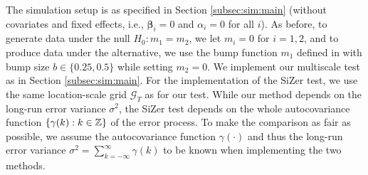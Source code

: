 \documentclass[12pt]{article}
\makeatletter
\renewcommand{\eqref}[1]{\tagform@{\ref{#1}}}
\makeatother
\begin{document}
The simulation setup is as specified in Section \ref{subsec:sim:main} (without covariates and fixed effects, i.e., $\boldsymbol{\beta}_i = 0$ and $\alpha_i = 0$ for all $i$).
As before, to generate data under the null $H_0: m_1 = m_2$, we let $m_i = 0$ for $i=1, 2$, and to produce data under the alternative, we use the bump function $m_1$ defined in \eqref{eq:bump-fct} with bump size $b \in \{ 0.25, 0.5 \}$ while setting $m_2 = 0$.
We implement our multiscale test as in Section \ref{subsec:sim:main}. For the implementation of the SiZer test, we use the same location-scale grid $\mathcal{G}_T$ as for our test. While our method depends on the long-run error variance $\sigma^2$, the SiZer test depends on the whole autocovariance function $\{ \gamma(k): k \in \mathbb{Z}\}$ of the error process. To make the comparison as fair as possible, we assume the autocovariance function $\gamma(\cdot)$ and thus the long-run error variance $\sigma^2 = \sum_{k=-\infty}^\infty \gamma(k)$ to be known when implementing the two methods.
\end{document}
